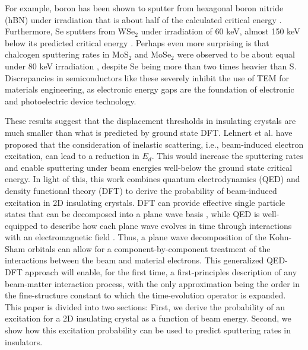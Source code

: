 \documentclass{article}
\begin{document}
For example, boron has been shown to sputter from hexagonal boron nitride (hBN) under irradiation that is about half of the calculated critical energy \cite{Susi2019, Cretu2015}.  Furthermore, Se sputters from WSe$_2$ under irradiation of 60 keV, almost 150 keV below its predicted critical energy \cite{Lin2015}.  Perhaps even more surprising is that chalcogen sputtering rates in MoS$_2$ and MoSe$_2$ were observed to be about equal under 80 keV irradiation \cite{Lehnert2017}, despite Se being more than two times heavier than S.
Discrepancies in semiconductors like these severely inhibit the use of TEM for materials engineering, as electronic energy gaps are the foundation of electronic and photoelectric device technology. 


These results suggest that the displacement thresholds in insulating crystals are much smaller than what is predicted by ground state DFT.  Lehnert et al. \cite{Lehnert2017} have proposed that the consideration of inelastic scattering, i.e., beam-induced electron excitation, can lead to a reduction in $E_d$.   This would increase the sputtering rates and enable sputtering under beam energies well-below the ground state critical energy.
In light of this, this work combines quantum electrodynamics (QED) and density functional theory (DFT) to derive the probability of beam-induced excitation in 2D insulating crystals.
DFT can provide effective single particle states that can be decomposed into a plane wave basis \cite{Hohenberg1964,Kohn1965,Kresse1996a}, while QED is well-equipped to describe how each plane wave evolves in time through interactions with an electromagnetic field \cite{Peskin1995,Lancaster2014}. Thus, a plane wave decomposition of the Kohn-Sham orbitals can allow for a component-by-component treatment of the interactions between the beam and material electrons.  This generalized QED-DFT approach will enable, for the first time, a first-principles description of any beam-matter interaction process, with the only approximation being the order in the fine-structure constant to which the time-evolution operator is expanded.
This paper is divided into two sections: First, we derive the probability of an excitation for a 2D insulating crystal as a function of beam energy. Second, we show how this excitation probability can be used to predict sputtering rates in insulators.
\end{document}
